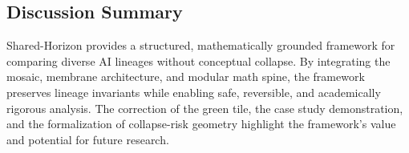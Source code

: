 \subsection{Discussion Summary}

Shared-Horizon provides a structured, mathematically grounded framework for
comparing diverse AI lineages without conceptual collapse. By integrating the
mosaic, membrane architecture, and modular math spine, the framework preserves
lineage invariants while enabling safe, reversible, and academically rigorous
analysis. The correction of the green tile, the case study demonstration, and
the formalization of collapse-risk geometry highlight the framework’s value and
potential for future research.
